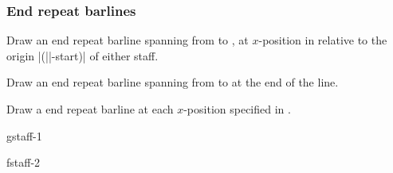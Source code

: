 \subsubsection{End repeat barlines}\label{sec:multistaff:barlines:end}
\begin{command}{\tmendrepeatbarline{}}
  Draw an end repeat barline spanning from  to 
  , at $x$-position  in relative to 
  the origin |(||-start)| of either staff.
\end{command}
\begin{command}{\tmendrepeatbarlineendline{}}
  Draw an end repeat barline spanning from  to 
   at the end of the line. 
\end{command}
\begin{command}{\tmendrepeatbarlineinline{}}
  Draw a end repeat barline at each $x$-position specified in .
\end{command}
\begin{codeexample}[]
\begin{tmline}%
\begin{tmstaff}{g}{staff-1}\end{tmstaff}%
\begin{tmstaff}{f}{staff-2}
\end{tmstaff}%
%
%
%
%
\end{tmline}
\end{codeexample}
